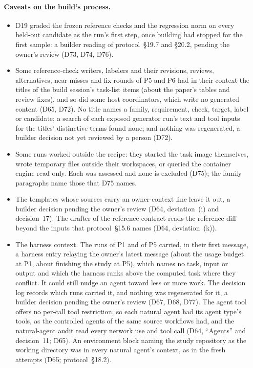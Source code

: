 \paragraph{Caveats on the build's process.}
\begin{itemize}
\item D19 graded the frozen reference checks and the regression norm on every held-out candidate as the run's first
  step, once building had stopped for the first sample: a builder reading of protocol~\S19.7 and \S20.2, pending the
  owner's review (D73, D74, D76).
\item Some reference-check writers, labelers and their revisions, reviews, alternatives, near misses and fix rounds of P5
  and P6 had in their context the titles of the build session's task-list items (about the paper's tables and review
  fixes), and so did some host coordinators, which write no generated content (D65, D72). No title names a family, requirement, check, target, label or candidate; a search of
  each exposed generator run's text and tool inputs for the titles' distinctive terms found none; and nothing was
  regenerated, a builder decision not yet reviewed by a person (D72).
\item Some runs worked outside the recipe: they started the task image themselves, wrote temporary files outside their
  workspaces, or queried the container engine read-only. Each was assessed and none is excluded (D75); the family
  paragraphs name those that D75 names.
\item The templates whose sources carry an owner-context line leave it out, a builder decision pending the owner's
  review (D64, deviation~(i) and decision~17). The drafter of the reference contract reads the reference diff beyond the
  inputs that protocol~\S15.6 names (D64, deviation~(k)).
\item The harness context. The runs of P1 and of P5 carried, in their first message, a harness entry relaying the
  owner's latest message (about the usage budget at P1, about finishing the study at P5), which names no task, input or
  output and which the harness ranks above the computed task where they conflict. It could still nudge an agent
  toward less or more work. The decision log records which runs carried it, and nothing was regenerated for it, a
  builder decision pending the owner's review (D67, D68, D77). The agent tool offers no per-call tool restriction, so each natural agent had its
  agent type's tools, as the controlled agents of the same source workflows had, and the natural-agent audit read every
  network use and tool call (D64, ``Agents'' and decision~11; D65). An environment block naming the study repository as
  the working directory was in every natural agent's context, as in the fresh attempts (D65; protocol~\S18.2).
\end{itemize}

